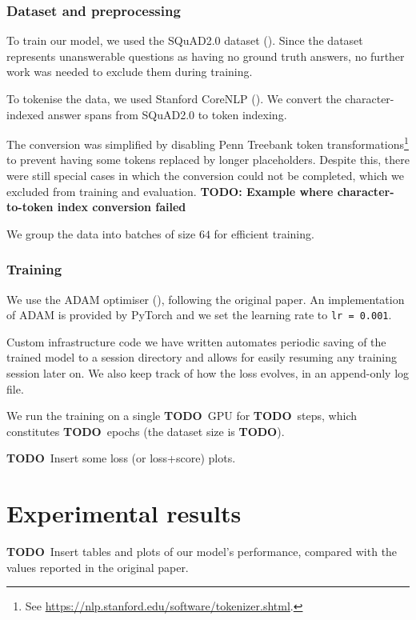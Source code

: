 \documentclass[a4paper, 10pt, conference]{article}
\newcommand{\ttt}{\texttt}
\newcommand{\TODO}{{\color{red}\textbf{TODO}}}
\newcommand{\TODOx}[1]{{\color{red}\textbf{TODO: #1}}}
\begin{document}
\subsubsection{Dataset and preprocessing}
To train our model, we used the SQuAD2.0 dataset (\cite{rajpurkar2018know}). 
Since the dataset represents unanswerable questions as having no ground truth answers, no further work was needed to exclude them during training.

To tokenise the data, we used Stanford CoreNLP (\cite{coreNLP}). We convert the character-indexed answer spans from SQuAD2.0 to token indexing.

The conversion was simplified by disabling Penn Treebank token transformations\footnote{See \url{https://nlp.stanford.edu/software/tokenizer.shtml}.} to prevent having some tokens replaced by longer placeholders. Despite this, there were still special cases in which the conversion could not be completed, which we excluded from training and evaluation. \TODOx{Example where character-to-token index conversion failed}

We group the data into batches of size $64$ for efficient training.

\subsubsection{Training}
We use the ADAM optimiser (\cite{adam}), following the original paper. An implementation of ADAM is provided by PyTorch and we set the learning rate to \ttt{lr = 0.001}.

Custom infrastructure code we have written automates periodic saving of the trained model to a session directory and allows for easily resuming any training session later on. We also keep track of how the loss evolves, in an append-only log file.

We run the training on a single \TODO\ GPU for \TODO\ steps, which constitutes \TODO\ epochs (the dataset size is \TODO).

\TODO\ Insert some loss (or loss+score) plots.

\section{Experimental results}

\TODO\ Insert tables and plots of our model's performance, compared with the values reported in the original paper.
\end{document}

